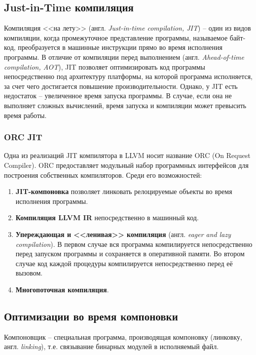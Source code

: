\subsection{Just-in-Time компиляция}
Компиляция <<на лету>> (англ. \textit{Just-in-time compilation, JIT}) --
один из видов компиляции, когда промежуточное представление программы, 
называемое байт-код, преобразуется в машинные инструкции прямо во время
исполнения программы. В отличие от компиляции перед выполнением (англ. 
\textit{Ahead-of-time compilation, AOT}), JIT позволяет оптимизировать код
программы непосредственно под архитектуру платформы, на которой программа
исполняется, за счет чего достигается повышение производительности. Однако, у
JIT есть недостаток -- увеличенное время запуска программы. В случае, если она
не выполняет сложных вычислений, время запуска и компиляции может превысить 
время работы.
\subsubsection{ORC JIT}
Одна из реализаций JIT компилятора в LLVM носит название ORC (On Request 
Compiler). ORC предоставляет модульный набор программных интерфейсов для 
построения собственных компиляторов. Среди его возможностей:
\begin{enumerate}
\item \textbf{JIT-компоновка} позволяет линковать релоцируемые объекты во время
исполнения программы.
\item \textbf{Компиляция LLVM IR} непосредственно в машинный код.
\item \textbf{Упереждающая и <<ленивая>> компиляция} (англ. \textit{eager and
lazy compilation}). В первом случае вся программа компилируется непосредственно
перед запуском программы и сохраняется в оперативной памяти. Во втором случае
код каждой процедуры компилируется непосредственно перед её вызовом.
\item \textbf{Многопоточная компиляция}.
\end{enumerate}

\subsection{Оптимизации во время компоновки}
Компоновщик -- специальная программа, производящая компоновку (линковку, англ.
\textit{linking}), т.е. связывание бинарных модулей в исполняемый файл.

